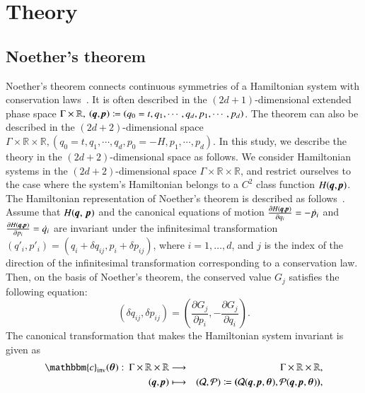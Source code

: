 \documentclass[preprint,
bibnotes,
 amsmath,amssymb,
 aps,
]{revtex4-1}
\begin{document}
\section{Theory}
\label{theory}
\subsection{Noether's theorem}
\label{sec_noether}
Noether's theorem connects continuous symmetries of a Hamiltonian system with conservation laws~\cite{noether1918nachr}. 
It is often described in the $(2d+1)$-dimensional extended phase space $\Gamma \times \mathbb{R}, \: \left(\textit{\textbf{q}}, \textit{\textbf{p}}\right)\coloneqq\left(q_0=t,q_1,\cdots,q_d,p_1,\cdots,p_d\right)$. The theorem can also be described in the $(2d+2)$-dimensional space $\Gamma \times \mathbb{R} \times \mathbb{R}, \left(q_0=t,q_1,\cdots,q_d,p_0=-H,p_1,\cdots,p_d\right)$. In this study, we describe the theory in the $(2d+2)$-dimensional space as follows. 
We consider Hamiltonian systems in the $(2d+2)$-dimensional space $\Gamma \times \mathbb{R} \times \mathbb{R}$, and restrict ourselves to the case where the system's Hamiltonian belongs to a $C^2$ class function $H(\textit{\textbf{q}},\textit{\textbf{p}})$. 
The Hamiltonian representation of Noether's theorem is described as follows~\cite{struckmeier2002canonical}. 
Assume that $H(\textit{\textbf{q}},\: \textit{\textbf{p}})$ and the canonical equations of motion  $\frac{\partial{H(\textit{\textbf{q}},\textit{\textbf{p}})}}{\partial{q_i}} = -\dot{p_i}$ and $\frac{\partial{H(\textit{\textbf{q}},\textit{\textbf{p}})}}{\partial{p_i}} = \dot{q_i}$ are invariant under the infinitesimal transformation $(q'_i, p'_i) = (q_i + \delta q_{ij}, p_i + \delta p_{ij})$, 
where $i=1, \dots, d$, and $j$ is the index of the direction of the infinitesimal transformation corresponding to a conservation law. 
Then, on the basis of Noether's theorem, the conserved value $G_j$ satisfies the following equation:
\begin{equation}
\label{noether}
(\delta q_{ij},\delta p_{ij}) = \left( \frac{\partial{G_{j}}}{\partial{p_i}}, -\frac{\partial{G_{j}}}{\partial{q_i}} \right).
\end{equation}
The canonical transformation that makes the Hamiltonian system invariant is given as 
\begin{eqnarray}
\mathbbm{c}_{\rm inv}(\boldsymbol{\theta}):\: \Gamma \times \mathbb{R} \times \mathbb{R} &\longrightarrow& \Gamma \times \mathbb{R} \times \mathbb{R},\\ 
\:(\textit{\textbf{q}},\textit{\textbf{p}}) &\longmapsto& (\mathbf{\mathcal{Q}},\mathbf{\mathcal{P}}) \coloneqq \textbf{(}\mathbf{\mathcal{Q}}(\textit{\textbf{q}},\textit{\textbf{p}}, \boldsymbol{\theta}),\mathbf{\mathcal{P}}(\textit{\textbf{q}},\textit{\textbf{p}}, \boldsymbol{\theta})\textbf{)},
\end{eqnarray}
\end{document}
